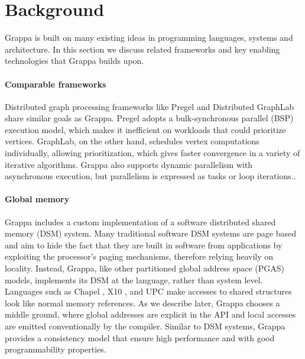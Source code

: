 \section{Background}

Grappa is built on many existing ideas in programming languages, systems and
architecture. In this section we discuss related frameworks and key enabling
technologies that Grappa builds upon.

\paragraph{Comparable frameworks} Distributed graph processing frameworks like
Pregel \cite{pregel:2010} and Distributed GraphLab \cite{distgraphlab:vldb12}
share similar goals as Grappa. Pregel adopts a bulk-synchronous parallel (BSP)
execution model, which makes it inefficient on workloads that could prioritize
vertices. GraphLab, on the other hand, schedules vertex computations
individually, allowing prioritization, which gives faster convergence in a
variety of iterative algorithms. Grappa also
supports dynamic parallelism with asynchronous execution, but parallelism is
expressed as tasks or loop iterations..

\paragraph{Global memory} Grappa includes a custom implementation of a
software distributed shared memory (DSM) system. Many traditional software DSM
systems are page based~\cite{Treadmarks,munin} and aim to hide the fact that
they are built in software from applications by exploiting the processor's
paging mechanisms, therefore relying heavily on locality. Instead, Grappa,
like other partitioned global address space (PGAS) models, implements its DSM
at the language, rather than system level. Languages such as Chapel
\cite{Chapel}, X10 \cite{X10}, and UPC \cite{UPC} make accesses to shared
structures look like normal memory references. As we describe later, Grappa
chooses a middle ground, where global addresses are explicit in the API and
local accesses are emitted conventionally by the compiler. Similar to DSM
systems, Grappa provides a consistency model that ensure high performance and
with good programmability properties. %

